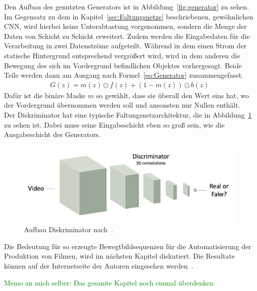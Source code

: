 \documentclass[times, 11pt,twocolumn]{article}
\begin{document}
Den Aufbau des genutzten Generators \cite{VondrickPT16} ist in Abbildung~\ref{fig:generator} zu sehen. Im Gegensatz zu dem in Kapitel~\ref{sec:Faltungsnetze} beschriebenen, gewöhnlichen CNN, wird hierbei keine Unterabtastung vorgenommen, sondern die Menge der Daten von Schicht zu Schicht erweitert. Zudem werden die Eingabedaten für die Verarbeitung in zwei Datenströme aufgeteilt. Während in dem einen Strom der statische Hintergrund entsprechend vergrößert wird, wird in dem anderen die Bewegung des sich im Vordergrund befindlichen Objektes vorhergesagt. Beide Teile werden dann am Ausgang nach Formel~\ref{eq:Generator} zusammengefasst.
\footnotesize
\begin{equation}
\begin{aligned}
G(z) = m(z) \odot f(z) + (1-m(z))\odot b(z)
\end{aligned}
	\label{eq:Generator}
\end{equation}
\small
Dafür ist die binäre Maske $m$ so gewählt, dass sie überall den Wert eins hat, wo der Vordergrund übernommen werden soll und ansonsten nur Nullen enthält. \\
Der Diskriminator hat eine typische Faltungsnetzarchitektur, die in Abbildung~\ref{fig:discriminator} zu sehen ist. Dabei muss seine Eingabeschicht eben so groß sein, wie die Ausgabeschicht des Generators.\\
\begin{figure}
	\flushleft
	\includegraphics[width=\columnwidth]{Bilder/discriminator.jpg}
	\caption{Aufbau Diskriminator nach~\cite{VondrickPT16}.}
	\label{fig:discriminator}
\end{figure}
Die Bedeutung für so erzeugte Bewegtbildsequenzen für die Automatisierung der Produktion von Filmen, wird im nächsten Kapitel diskutiert. Die Resultate können auf der Internetseite der Autoren eingesehen werden~\cite{VondrickInternet}.


\textcolor{green}{Memo an mich selber: Das gesamte Kapitel noch einmal überdenken}
\end{document}
